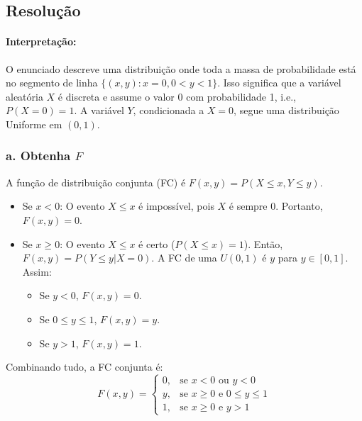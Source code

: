 \documentclass[12pt]{article}
\begin{document}
\subsection*{Resolução}

\paragraph{Interpretação:} O enunciado descreve uma distribuição onde toda a massa de probabilidade está no segmento de linha $\{ (x,y) : x=0, 0 < y < 1 \}$. Isso significa que a variável aleatória $X$ é discreta e assume o valor 0 com probabilidade 1, i.e., $P(X=0)=1$. A variável $Y$, condicionada a $X=0$, segue uma distribuição Uniforme em $(0,1)$.

\subsubsection*{a. Obtenha $F$}
A função de distribuição conjunta (FC) é $F(x,y) = P(X \le x, Y \le y)$.
\begin{itemize}
    \item Se $x < 0$: O evento $X \le x$ é impossível, pois $X$ é sempre 0. Portanto, $F(x,y)=0$.
    \item Se $x \ge 0$: O evento $X \le x$ é certo ($P(X \le x)=1$). Então, $F(x,y) = P(Y \le y | X=0)$. A FC de uma $U(0,1)$ é $y$ para $y \in [0,1]$. Assim:
    \begin{itemize}
        \item Se $y < 0$, $F(x,y) = 0$.
        \item Se $0 \le y \le 1$, $F(x,y) = y$.
        \item Se $y > 1$, $F(x,y) = 1$.
    \end{itemize}
\end{itemize}
Combinando tudo, a FC conjunta é:
\[ F(x,y) = \begin{cases} 0, & \text{se } x < 0 \text{ ou } y < 0 \\ y, & \text{se } x \ge 0 \text{ e } 0 \le y \le 1 \\ 1, & \text{se } x \ge 0 \text{ e } y > 1 \end{cases} \]
\end{document}
